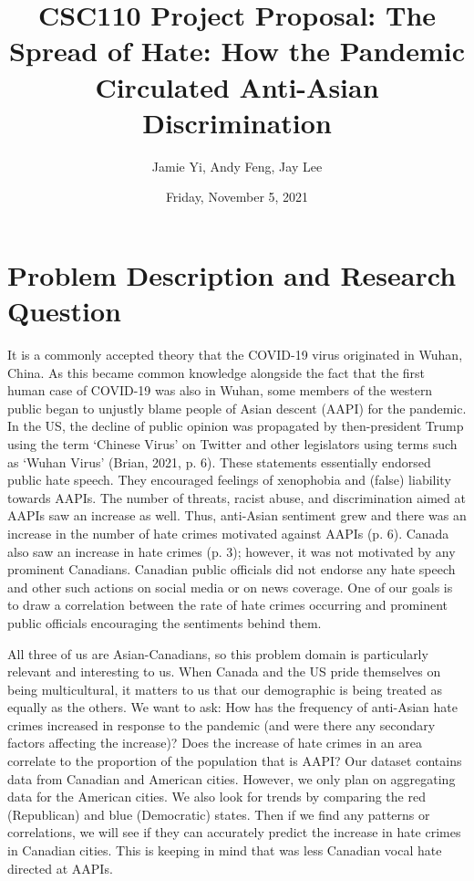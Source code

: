 \documentclass[fontsize=11pt]{article}
\title{CSC110 Project Proposal: The Spread of Hate: How the Pandemic Circulated Anti-Asian Discrimination}
\author{Jamie Yi, Andy Feng, Jay Lee}
\date{Friday, November 5, 2021}
\begin{document}
    \maketitle

    \section*{Problem Description and Research Question}

    It is a commonly accepted theory that the COVID-19 virus originated in Wuhan, China. As this became common knowledge alongside the fact that the first human case of COVID-19 was also in Wuhan, some members of the western public began to unjustly blame people of Asian descent (AAPI) for the pandemic. In the US, the decline of public opinion was propagated by then-president Trump using the term ‘Chinese Virus’ on Twitter and other legislators using terms such as ‘Wuhan Virus’ (Brian, 2021, p. 6). These statements essentially endorsed public hate speech. They encouraged feelings of xenophobia and (false) liability towards AAPIs. The number of threats, racist abuse, and discrimination aimed at AAPIs saw an increase as well. Thus, anti-Asian sentiment grew and there was an increase in the number of hate crimes motivated against AAPIs (p. 6). Canada also saw an increase in hate crimes (p. 3); however, it was not motivated by any prominent Canadians. Canadian public officials did not endorse any hate speech and other such actions on social media or on news coverage. One of our goals is to draw a correlation between the rate of hate crimes occurring and prominent public officials encouraging the sentiments behind them.


    All three of us are Asian-Canadians, so this problem domain is particularly relevant and interesting to us. When Canada and the US pride themselves on being multicultural, it matters to us that our demographic is being treated as equally as the others. We want to ask: How has the frequency of anti-Asian hate crimes increased in response to the pandemic (and were there any secondary factors affecting the increase)? Does the increase of hate crimes in an area correlate to the proportion of the population that is AAPI? Our dataset contains data from Canadian and American cities. However, we only plan on aggregating data for the American cities. We also look for trends by comparing the red (Republican) and blue (Democratic) states. Then if we find any patterns or correlations, we will see if they can accurately predict the increase in hate crimes in Canadian cities. This is keeping in mind that was less Canadian vocal hate directed at AAPIs.
\end{document}
